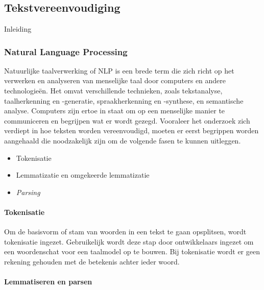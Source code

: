 \chapter{}%
\label{ch:stand-van-zaken}

\section{Tekstvereenvoudiging}

Inleiding

\subsection{Natural Language Processing}

Natuurlijke taalverwerking of NLP is een brede term die zich richt op het verwerken en analyseren van menselijke taal door computers en andere technologieën. Het omvat verschillende technieken, zoals tekstanalyse, taalherkenning en -generatie, spraakherkenning en -synthese, en semantische analyse. Computers zijn ertoe in staat om op een menselijke manier te communiceren en begrijpen wat er wordt gezegd. Vooraleer het onderzoek zich verdiept in hoe teksten worden vereenvoudigd, moeten er eerst begrippen worden aangehaald die noodzakelijk zijn om de volgende fasen te kunnen uitleggen.

\begin{itemize}
	\item Tokenisatie
	\item Lemmatizatie en omgekeerde lemmatizatie
	\item \textit{Parsing}
\end{itemize}

\subsubsection{Tokenisatie}


Om de basisvorm of stam van woorden in een tekst te gaan opsplitsen, wordt tokenisatie ingezet. Gebruikelijk wordt deze stap door ontwikkelaars ingezet om een woordenschat voor een taalmodel op te bouwen. Bij tokenisatie wordt er geen rekening gehouden met de betekenis achter ieder woord.


\subsubsection{Lemmatiseren en parsen}

